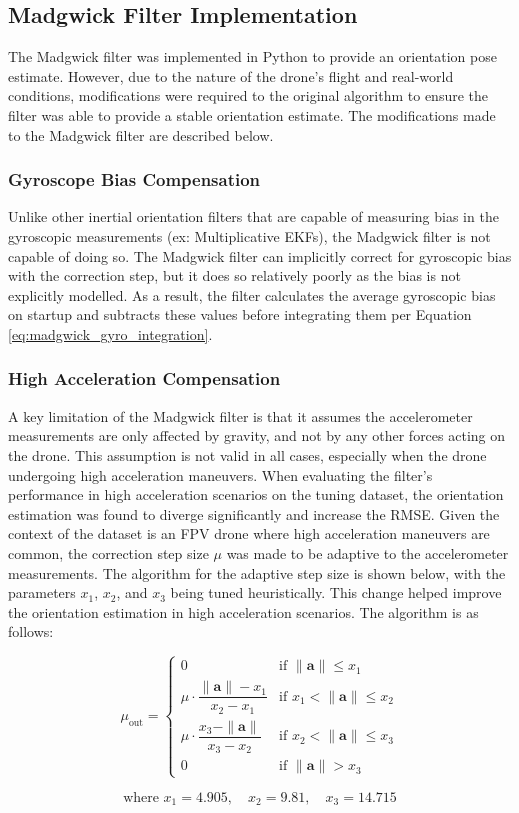 \documentclass[bare_jrnl_transmag]{subfiles}
\begin{document}
\subsection{Madgwick Filter Implementation}
The Madgwick filter was implemented in Python to provide an orientation pose estimate. However, due to the nature of the drone's flight and real-world conditions, modifications were required to the original algorithm to ensure the filter was able to provide a stable orientation estimate. The modifications made to the Madgwick filter are described below.

\subsubsection{Gyroscope Bias Compensation}
Unlike other inertial orientation filters that are capable of measuring bias in the gyroscopic measurements (ex: Multiplicative EKFs), the Madgwick filter is not capable of doing so. The Madgwick filter can implicitly correct for gyroscopic bias with the correction step, but it does so relatively poorly as the bias is not explicitly modelled. As a result, the filter calculates the average gyroscopic bias on startup and subtracts these values before integrating them per Equation \ref{eq:madgwick_gyro_integration}.

\subsubsection{High Acceleration Compensation}
A key limitation of the Madgwick filter is that it assumes the accelerometer measurements are only affected by gravity, and not by any other forces acting on the drone. This assumption is not valid in all cases, especially when the drone undergoing high acceleration maneuvers. When evaluating the filter's performance in high acceleration scenarios on the tuning dataset, the orientation estimation was found to diverge significantly and increase the RMSE. Given the context of the dataset is an FPV drone where high acceleration maneuvers are common, the correction step size $\mu$ was made to be adaptive to the accelerometer measurements. The algorithm for the adaptive step size is shown below, with the parameters $x_1$, $x_2$, and $x_3$ being tuned heuristically. This change helped improve the orientation estimation in high acceleration scenarios. The algorithm is as follows:

\[
\mu_{\text{out}} =
\begin{cases}
0 & \text{if } \|\mathbf{a}\| \leq x_1 \\
\mu \cdot \dfrac{\|\mathbf{a}\| - x_1}{x_2 - x_1} & \text{if } x_1 < \|\mathbf{a}\| \leq x_2 \\
\mu \cdot \dfrac{x_3 - \|\mathbf{a}\|}{x_3 - x_2} & \text{if } x_2 < \|\mathbf{a}\| \leq x_3 \\
0 & \text{if } \|\mathbf{a}\| > x_3
\end{cases}
\]

\[
\text{where } x_1 = 4.905, \quad x_2 = 9.81, \quad x_3 = 14.715
\]
\end{document}
